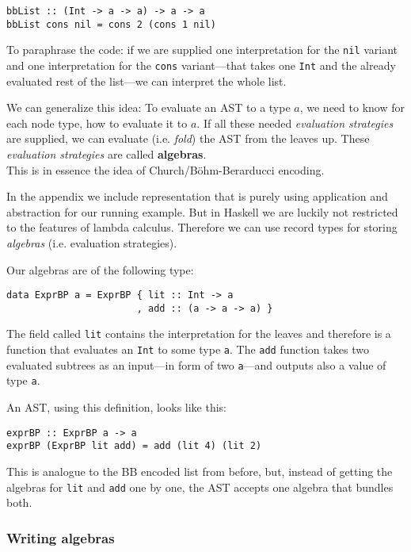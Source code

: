 \begin{lstlisting}
bbList :: (Int -> a -> a) -> a -> a
bbList cons nil = cons 2 (cons 1 nil)
\end{lstlisting}

To paraphrase the code: if we are supplied one interpretation for the
\texttt{nil} variant and one interpretation for the \texttt{cons} variant—that
takes one \texttt{Int} and the already evaluated rest of the list—we can
interpret the whole list.

We can generalize this idea: To evaluate an AST to a type $a$, we need to know
for each node type, how to evaluate it to $a$. If all these needed
\emph{evaluation strategies} are supplied, we can evaluate (i.e. \emph{fold})
the AST from the leaves up. These \emph{evaluation strategies} are called
\textbf{algebras}.\\
This is in essence the idea of Church/Böhm-Berarducci encoding.

In the appendix we include representation that is purely using application and
abstraction for our running example. But in Haskell we are luckily not
restricted to the features of lambda calculus. Therefore we can use record types
for storing \emph{algebras} (i.e. evaluation strategies).

Our algebras are of the following type:

\begin{lstlisting}
data ExprBP a = ExprBP { lit :: Int -> a
                       , add :: (a -> a -> a) }
\end{lstlisting}

The field called \texttt{lit} contains the interpretation for the leaves and
therefore is a function that evaluates an \texttt{Int} to some type \texttt{a}.
The \texttt{add} function takes two evaluated subtrees as an input—in form of
two \texttt{a}—and outputs also a value of type \texttt{a}.

An AST, using this definition, looks like this:

\begin{lstlisting}
exprBP :: ExprBP a -> a
exprBP (ExprBP lit add) = add (lit 4) (lit 2)
\end{lstlisting}

This is analogue to the BB encoded list from before, but, instead of getting
the algebras for \texttt{lit} and \texttt{add} one by one, the AST accepts one
algebra that bundles both.

\subsubsection{Writing algebras}

